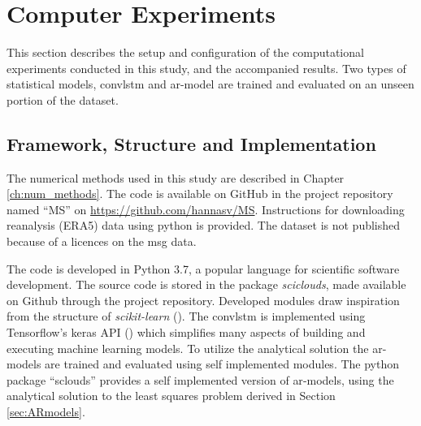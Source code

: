 \section{Computer Experiments} \label{ch:computer_experiments}
This section describes the setup and configuration of the computational experiments conducted in this study, and the accompanied results. Two types of statistical models, \acrshort{convlstm} and \acrshort{ar}-model are trained and evaluated on an unseen portion of the dataset. 

\subsection{Framework, Structure and Implementation} \label{sec:structure_and_implementations} \label{sec:framework}
The numerical methods used in this study are described in Chapter \ref{ch:num_methods}. The code is available on GitHub in the project repository named ``MS'' on \href{https://github.com/hannasv/MS}{https://github.com/hannasv/MS}. Instructions for downloading 
reanalysis (ERA5) data using python is provided. 
The dataset is not published because of a licences on the \acrshort{msg} data. 

The code is developed in Python 3.7, a popular language for scientific software development. The source code is stored in the package \textit{sciclouds}, made available on Github through the project repository. Developed modules draw inspiration from the structure of \textit{scikit-learn} (\cite{sklearn_api}).
The \acrshort{convlstm} is implemented using Tensorflow's keras API (\cite{tensorflow2015}) which simplifies many aspects of building and executing machine learning models. To utilize the analytical solution the \acrshort{ar}-models are trained and evaluated using self implemented modules.
The python package ``sclouds'' provides a self implemented version of \acrshort{ar}-models, using the analytical solution to the least squares problem derived in Section \ref{sec:ARmodels}.

